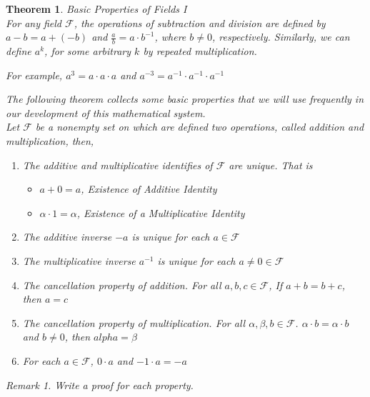 \documentclass{book}
\newtheorem{theorem}{Theorem}[section]
\theoremstyle{definition}
\theoremstyle{remark}
\newtheorem{remark}{Remark}
\newcommand{\cc}[1]{\mathcal{#1}}
\newcommand{\m}{\cdot}
\begin{document}
\begin{tcolorbox}
    \begin{theorem}
    Basic Properties of Fields I \\
    
        For any field $\cc{F}$, the operations of subtraction and division are defined by $a - b = a + (- b)$ and $\frac{a}{b} = a \m {b}^{-1}$, where $b \neq 0$, respectively. Similarly, we can define ${a}^k$, for some arbitrary $k$ by repeated multiplication.
            \begin{center}
                For example, $a^3 = a \m a \m a$ and $a^{-3} = a^{-1} \m a^{-1} \m a^{-1}$
            \end{center}
        
        The following theorem collects some basic properties that we will use frequently in our development of this mathematical system. \\ 
        
        Let $\cc{F}$ be a nonempty set on which are defined two operations, called addition and multiplication, then, 
            \begin{enumerate}
                \item The additive and multiplicative identifies of $\cc{F}$ are unique. That is 
                    \begin{itemize}
                        \item $a + 0 = a$, \textit{Existence of Additive Identity}
                        \item $\alpha \m 1 = \alpha$, \textit{Existence of a Multiplicative Identity}
                    \end{itemize}
                \item The additive inverse $-a$ is unique for each $a \in \cc{F}$
                
                \item The multiplicative inverse $a^{-1}$ is unique for each $a \neq 0 \in \cc{F}$
                
                \item The cancellation property of addition. For all $a,b,c \in \cc{F}$, If $a + b = b + c$, then $a = c$ 
            
                \item The cancellation property of multiplication. For all $\alpha , \beta , b \in \cc{F}$. $\alpha \m b = \alpha \m b$ and $b \neq 0$, then $alpha = \beta$
                
                \item For each $a \in \cc{F}$, $0 \m a$ and $-1 \m a = -a$
            \end{enumerate}

        \begin{remark}
            Write a proof for each property. 
        \end{remark}
        
    \end{theorem}
\end{tcolorbox}
\end{document}
